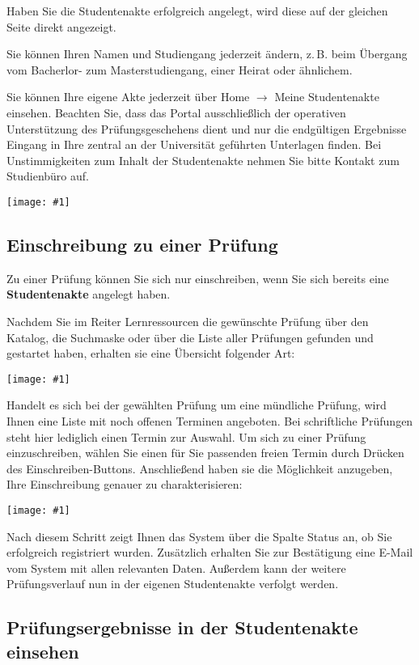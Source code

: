\documentclass[a4paper,11pt]{article}
\newcommand{\bild}[1]{
    \begin{center}\texttt{[image: \#1]}\end{center}
}
\newcommand{\knopf}[1]{{\sc #1}}
\begin{document}
Haben Sie die Studentenakte erfolgreich angelegt, wird diese auf der gleichen
Seite direkt angezeigt.

Sie können Ihren Namen und Studiengang jederzeit ändern, z.\,B. beim
Übergang vom Bacherlor- zum Masterstudiengang, einer Heirat oder ähnlichem.

Sie können Ihre eigene Akte jederzeit über \knopf{Home $\rightarrow$ Meine
Studentenakte} einsehen. Beachten Sie, dass das Portal ausschließlich der operativen
Unterstützung des Prüfungsgeschehens dient und nur die endgültigen Ergebnisse
Eingang in Ihre zentral an der Universität geführten Unterlagen finden. Bei
Unstimmigkeiten zum Inhalt der Studentenakte nehmen Sie bitte Kontakt zum Studienbüro
auf.

\bild{esf}

\subsection{Einschreibung zu einer Prüfung}

Zu einer Prüfung können Sie sich nur einschreiben, wenn Sie sich bereits eine
{\bf Studentenakte} angelegt haben.

Nachdem Sie im Reiter \knopf{Lernressourcen} die gewünschte Prüfung über den
Katalog, die Suchmaske oder über die Liste aller Prüfungen gefunden und
gestartet haben, erhalten sie eine Übersicht folgender Art:

\bild{student-exam}

Handelt es sich bei der gewählten Prüfung um eine mündliche Prüfung, wird
Ihnen eine Liste mit noch offenen Terminen angeboten. Bei schriftliche Prüfungen
steht hier lediglich einen Termin zur Auswahl. Um sich zu einer Prüfung einzuschreiben,
wählen Sie einen für Sie passenden freien Termin durch Drücken des
\knopf{Einschreiben}-Buttons. Anschließend haben sie die Möglichkeit anzugeben,
Ihre Einschreibung genauer zu charakterisieren:

\bild{student-exam2}

Nach diesem Schritt zeigt Ihnen das System über die Spalte \knopf{Status} an, ob
Sie erfolgreich registriert wurden. Zusätzlich erhalten Sie
zur Bestätigung eine E-Mail vom System mit allen relevanten Daten. Außerdem kann der
weitere Prüfungsverlauf nun in der eigenen Studentenakte verfolgt werden.
 
\subsection{Prüfungsergebnisse in der Studentenakte einsehen}
\end{document}
